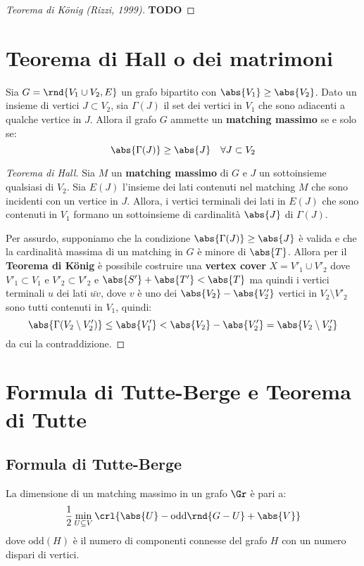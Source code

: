 \documentclass[\main/main.tex]{subfiles}
\begin{document}
\begin{proof}[Teorema di König (Rizzi, 1999)]
	\textbf{TODO}
\end{proof}

\section{Teorema di Hall o dei matrimoni}
\begin{theorem}
	Sia \(G = \rnd{V_1 \cup V_2, E}\) un grafo bipartito con \(\abs{V_1} \geq \abs{V_2}\). Dato un insieme di vertici \(J \subset V_2\), sia \(\Gamma(J) \) il set dei vertici in \(V_1\) che sono adiacenti a qualche vertice in \(J\). Allora il grafo \(G\) ammette un \textbf{matching massimo} se e solo se:
	\[
		\abs{\Gamma(J)} \geq \abs{J} \quad \forall J \subset V_2
	\]
\end{theorem}

\begin{proof}[Teorema di Hall]
	Sia \(M\) un \textbf{matching massimo} di \(G\) e \(J\) un sottoinsieme qualsiasi di \(V_2\). Sia \(E(J)\) l'insieme dei lati contenuti nel matching \(M\) che sono incidenti con un vertice in \(J\). Allora, i vertici terminali dei lati in \(E(J)\) che sono contenuti in \(V_1\) formano un sottoinsieme di cardinalità \(\abs{J}\) di \(\Gamma(J)\).

	Per assurdo, supponiamo che la condizione \(\abs{\Gamma(J)} \geq \abs{J}\) è valida e che la cardinalità massima di un matching in \(G\) è minore di \(\abs{T}\). Allora per il \textbf{Teorema di König} è possibile costruire una \textbf{vertex cover} \(X=V'_1 \cup V'_2\) dove \(V'_1 \subset V_1\) e \(V'_2 \subset V'_2\) e \(\abs{S'} + \abs{T'} < \abs{T}\) ma quindi i vertici terminali \(u\) dei lati \(\bar{uv}\), dove \(v\) è uno dei \(\abs{V_2} - \abs{V'_2}\) vertici in \(V_2\setminus V'_2\) sono tutti contenuti in \(V_1\), quindi:
	\[
		\abs{\Gamma(V_2\setminus V'_2)} \leq \abs{V'_1} < \abs{V_2} - \abs{V'_2} = \abs{V_2\setminus V'_2}
	\]
	da cui la contraddizione.
\end{proof}

\section{Formula di Tutte-Berge e Teorema di Tutte}
\subsection{Formula di Tutte-Berge}
\begin{theorem}
	La dimensione di un matching massimo in un grafo \(\Gr \) è pari a:
	\[
		\frac{1}{2} \min_{U \subseteq V} \crl{\abs{U} - \text{odd}\rnd{G-U} + \abs{V}}
	\]
	dove \(\text{odd}(H)\) è il numero di componenti connesse del grafo \(H\) con un numero dispari di vertici.
\end{theorem}
\end{document}

